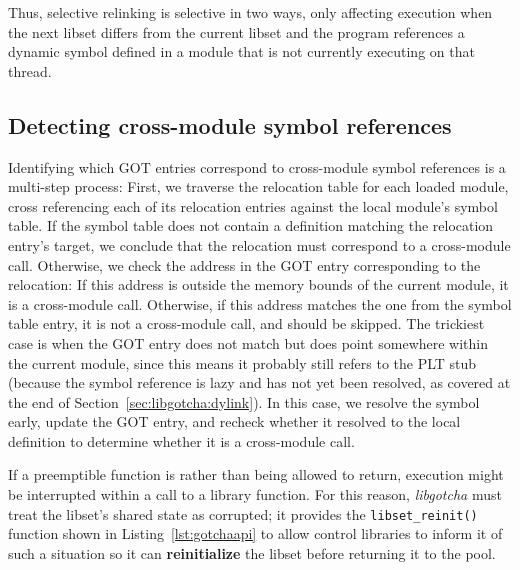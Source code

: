 \begin{promotesubsections}




\end{promotesubsections}

Thus, selective relinking is selective in two ways, only affecting execution when the
next libset differs from the current libset and the program references a dynamic
symbol defined in a module that is not currently executing on that thread.


\subsection{Detecting cross-module symbol references}
\label{sec:libgotcha:crossref}

Identifying which GOT entries correspond to cross-module symbol references is a
multi-step process:
First, we traverse the relocation table for each loaded module, cross referencing
each of its relocation entries against the local module's symbol table.  If the
symbol table does not contain a definition matching the relocation entry's target, we
conclude that the relocation must correspond to a cross-module call.  Otherwise, we
check the address in the GOT entry corresponding to the relocation:  If this address
is outside the memory bounds of the current module, it is a cross-module call.
Otherwise, if this address matches the one from the symbol table entry, it is not a
cross-module call, and should be skipped.  The trickiest case is when the GOT entry
does not match but does point somewhere within the current module, since this means
it probably still refers to the PLT stub (because the symbol reference is lazy and
has not yet been resolved, as covered at the end of
Section~\ref{sec:libgotcha:dylink}).  In this case, we resolve the symbol early,
update the GOT entry, and recheck whether it resolved to the local definition to
determine whether it is a cross-module call.


\begin{promotesubsections}

\end{promotesubsections}

If a preemptible function is  rather than being allowed to return,
execution might be interrupted within a call to a library function.  For this reason,
\textit{libgotcha} must treat the libset's shared state as corrupted; it provides the
\texttt{libset\_reinit()} function shown in Listing~\ref{lst:gotchaapi} to allow
control libraries to inform it of such a situation so it can \textbf{reinitialize}
the libset before returning it to the pool.

